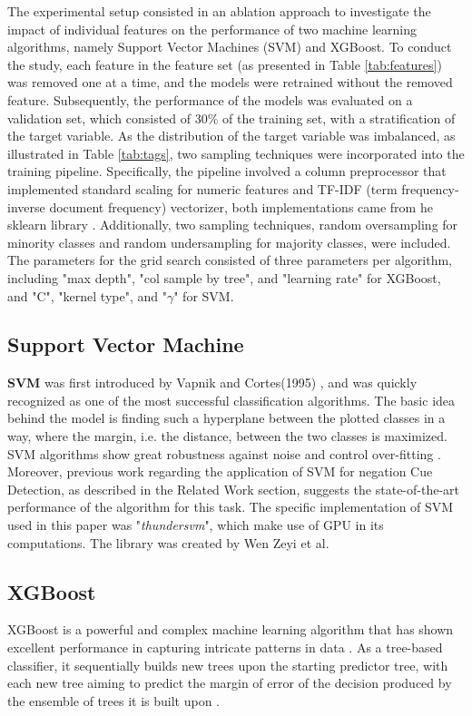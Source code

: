 The experimental setup consisted in an ablation approach to investigate the impact of individual features on the performance of two machine learning algorithms, namely Support Vector Machines (SVM) and XGBoost. To conduct the study, each feature in the feature set (as presented in Table \ref{tab:features}) was removed one at a time, and the models were retrained without the removed feature. Subsequently, the performance of the models was evaluated on a validation set, which consisted of 30\% of the training set, with a stratification of the target variable. As the distribution of the target variable was imbalanced, as illustrated in Table \ref{tab:tags}, two sampling techniques were incorporated into the training pipeline. Specifically, the pipeline involved a column preprocessor that implemented standard scaling for numeric features and TF-IDF (term frequency-inverse document frequency) vectorizer, both implementations came from he sklearn library \cite{scikit-learn}. Additionally, two sampling techniques, random oversampling for minority classes and random undersampling for majority classes, were included. The parameters for the grid search consisted of three parameters per algorithm, including "max depth", "col sample by tree", and "learning rate" for XGBoost, and "C", "kernel type", and "$\gamma$" for SVM.


\subsection{Support Vector Machine} 
\textbf{SVM} was first introduced by Vapnik and Cortes(1995) \cite{vapnik1995}, and was quickly recognized as one of the most successful classification algorithms. The basic idea behind the model is finding such a hyperplane between the plotted classes in a way, where the margin, i.e. the distance, between the two classes is maximized. SVM algorithms show great robustness against noise and control over-fitting \cite{robust2009}. Moreover, previous work regarding the application of SVM for negation Cue Detection, as described in the Related Work section, suggests the state-of-the-art performance of the algorithm for this task. The specific implementation of SVM used in this paper was  "\textit{thundersvm}", which make use of GPU in its computations. The library was created by Wen Zeyi et al. \cite{thundersvm}


\subsection{XGBoost}
XGBoost is a powerful and complex machine learning algorithm that has shown excellent performance in capturing intricate patterns in data \cite{minasny2009elements}. As a tree-based classifier, it sequentially builds new trees upon the starting predictor tree, with each new tree aiming to predict the margin of error of the decision produced by the ensemble of trees it is built upon \cite{minasny2009elements}.

